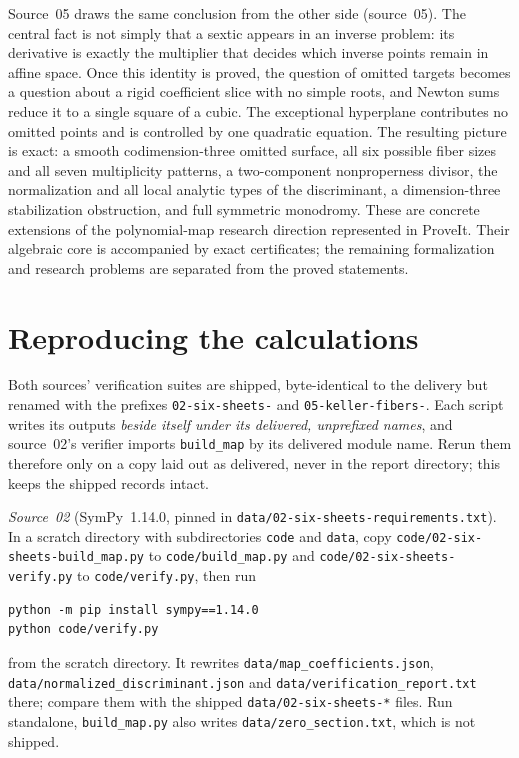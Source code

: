\documentclass[11pt,a4paper]{article}
\theoremstyle{definition}
\newcommand{\code}[1]{\texttt{\nolinkurl{#1}}}
\newcommand{\src}[1]{\textup{(source~#1)}}
\begin{document}
Source~05 draws the same conclusion from the other side \src{05}. The central
fact is not simply that a sextic appears in an inverse problem: its
derivative is exactly the multiplier that decides which inverse points remain
in affine space. Once this identity is proved, the question of omitted
targets becomes a question about a rigid coefficient slice with no simple
roots, and Newton sums reduce it to a single square of a cubic. The
exceptional hyperplane contributes no omitted points and is controlled by one
quadratic equation. The resulting picture is exact: a smooth
codimension-three omitted surface, all six possible fiber sizes and all seven
multiplicity patterns, a two-component nonproperness divisor, the
normalization and all local analytic types of the discriminant, a
dimension-three stabilization obstruction, and full symmetric monodromy.
These are concrete extensions of the polynomial-map research direction
represented in ProveIt. Their algebraic core is accompanied by exact
certificates; the remaining formalization and research problems are
separated from the proved statements.

\appendix
{}
\section{Reproducing the calculations}
\label{f6:app:reproduce}
Both sources' verification suites are shipped, byte-identical to the
delivery but renamed with the prefixes \code{02-six-sheets-} and
\code{05-keller-fibers-}. Each script writes its outputs \emph{beside itself
under its delivered, unprefixed names}, and source~02's verifier imports
\code{build_map} by its delivered module name. Rerun them therefore only on a
copy laid out as delivered, never in the report directory; this keeps the
shipped records intact.

\emph{Source~02} (SymPy~1.14.0, pinned in
\code{data/02-six-sheets-requirements.txt}). In a scratch directory with
subdirectories \code{code} and \code{data}, copy
\code{code/02-six-sheets-build_map.py} to \code{code/build_map.py} and
\code{code/02-six-sheets-verify.py} to \code{code/verify.py}, then run
\begin{lstlisting}
python -m pip install sympy==1.14.0
python code/verify.py
\end{lstlisting}
from the scratch directory. It rewrites \code{data/map_coefficients.json},
\code{data/normalized_discriminant.json} and
\code{data/verification_report.txt} there; compare them with the shipped
\code{data/02-six-sheets-*} files. Run standalone, \code{build_map.py} also
writes \code{data/zero_section.txt}, which is not shipped.
\end{document}
